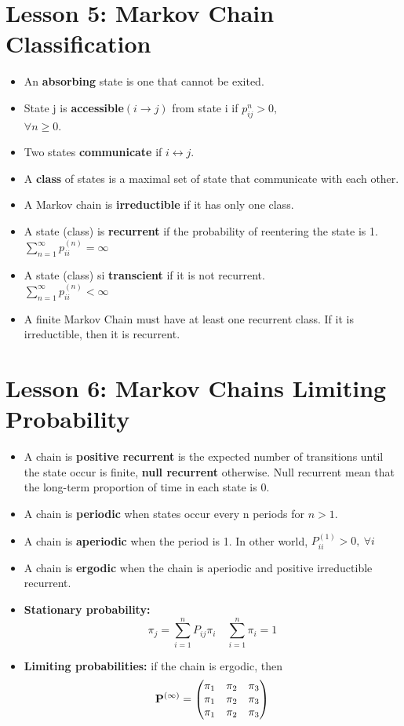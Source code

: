 \documentclass[10pt, french]{article}
\begin{document}
\begin{multicols*}{3}
\section*{Lesson 5: Markov Chain Classification}
\begin{itemize}[align=left,leftmargin=*]
    \item An \textbf{absorbing} state is one that cannot be exited.
    \item State j is \textbf{accessible}$(i \rightarrow j)$ from state i if $p_{ij}^n > 0,$ \\ $ \forall n \geq 0$.
    \item Two states \textbf{communicate} if $i \leftrightarrow j$.
    \item A \textbf{class} of states is a maximal set of state that communicate with each other.
    \item A Markov chain is \textbf{irreductible} if it has only one class.
    \item A state (class) is \textbf{recurrent} if the probability of reentering the state is 1. $\sum_{n=1}^\infty p_{ii}^{(n)} = \infty$
    \item A state (class) si \textbf{transcient} if it is not recurrent.\\ $\sum_{n=1}^\infty p_{ii}^{(n)} < \infty$
    \item A finite Markov Chain must have at least one recurrent class. If it is irreductible, then it is recurrent.
\end{itemize}

\section*{Lesson 6: Markov Chains Limiting Probability}
\label{Stochastic Processes}
\begin{itemize}[align=left,leftmargin=*]
    \item A chain is \textbf{positive recurrent} is the expected number of transitions until the state occur is finite, \textbf{null recurrent} otherwise. Null recurrent mean that the long-term proportion of time in each state is 0.
    \item A chain is \textbf{periodic} when states occur every n periods for $n > 1$.
    \item A chain is \textbf{aperiodic} when the period is 1. In other world, $P_{ii}^{(1)} > 0,\: \forall i$
    \item A chain is \textbf{ergodic} when the chain is aperiodic and positive irreductible recurrent.
    \item \textbf{Stationary probability:} \[ \pi_j = \sum_{i=1}^n P_{ij}\pi_i \quad \sum_{i=1}^n \pi_i = 1\]
    \item \textbf{Limiting probabilities:} if the chain is ergodic, then
    \[
    \mathbf{P}^{(\infty)} =
    \begin{pmatrix}
    \pi_1 & \pi_2 & \pi_3 \\
    \pi_1 & \pi_2 & \pi_3 \\
    \pi_1 & \pi_2 & \pi_3
    \end{pmatrix}
    \]
\end{itemize}


\end{multicols*}
\end{document}
